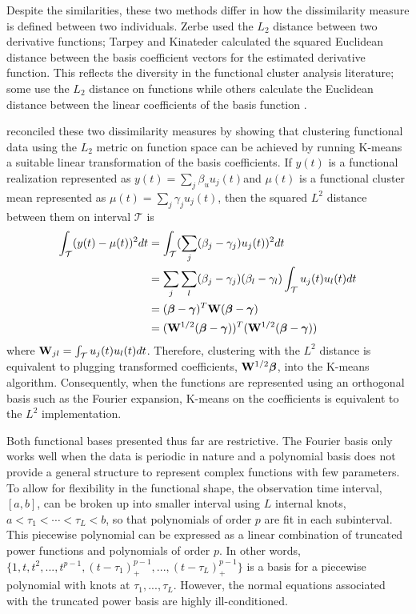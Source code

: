 Despite the similarities, these two methods differ in how the dissimilarity measure is defined between two individuals. Zerbe used the $L_{2}$ distance between two derivative functions; Tarpey and Kinateder calculated the squared Euclidean distance between the basis coefficient vectors for the estimated derivative function. This reflects the diversity in the functional cluster analysis literature; some use the $L_{2}$ distance on functions \cite{hitchcock2007} while others calculate the Euclidean distance between the linear coefficients of the basis function \cite{abraham2003,serban2005, tarpey2003}.
 
\Textcite{tarpey2007} reconciled these two dissimilarity measures by showing that clustering functional data using the $L_{2}$ metric on function space can be achieved by running K-means a suitable linear transformation of the basis coefficients. If $y(t)$ is a functional realization represented as $y(t)=\sum_{j}\beta_{u}u_{j}(t)$and $\mu(t)$ is a functional cluster mean represented as $\mu(t) = \sum_{j}\gamma_{j}u_{j}(t)$, then the squared $L^{2}$ distance between them on interval $\mathcal{T}$ is
\begin{align*}
\int_{\mathcal{T}}(y(t)-\mu(t))^{2}dt &= \int_{\mathcal{T}}(\sum_{j}(\beta_{j}-\gamma_{j})u_{j}(t))^{2}dt\\
&= \sum_{j}\sum_{l}(\beta_{j}-\gamma_{j})(\beta_{l}-\gamma_{l}) \int_{\mathcal{T}}u_{j}(t)u_{l}(t)dt\\
&=(\boldsymbol\beta-\boldsymbol\gamma)^{T}\mathbf W (\boldsymbol\beta-\boldsymbol\gamma)\\
&=(\mathbf W^{1/2}(\boldsymbol\beta-\boldsymbol\gamma))^{T} (\mathbf W^{1/2}(\boldsymbol\beta-\boldsymbol\gamma))
\end{align*}
where $\mathbf W_{jl} = \int_{\mathcal{T}}u_{j}(t)u_{l}(t)dt$. Therefore, clustering with the $L^{2}$ distance is equivalent to plugging transformed coefficients, $\mathbf W^{1/2}\boldsymbol\beta$, into the K-means algorithm. Consequently, when the functions are represented using an orthogonal basis such as the Fourier expansion, K-means on the coefficients is equivalent to the $L^{2}$ implementation.

Both functional bases presented thus far are restrictive. The Fourier basis only works well when the data is periodic in nature and a polynomial basis does not provide a general structure to represent complex functions with few parameters. 
To allow for flexibility in the functional shape, the observation time interval, $[a,b]$, can be broken up into smaller interval using $L$ internal knots, $a<\tau_{1}<\cdots<\tau_{L}<b$, so that polynomials of order $p$ are fit in each subinterval. This piecewise polynomial can be expressed as a linear combination of truncated power functions and polynomials of order $p$. In other words,
$\{1,t,t^{2},...,t^{p-1},(t-\tau_{1})_{+}^{p-1},...,(t-\tau_{L})_{+}^{p-1}\}$
is a basis for a piecewise polynomial with knots at $\tau_{1},...,\tau_{L}$. However, the normal equations associated with the truncated power basis are highly ill-conditioned. 

